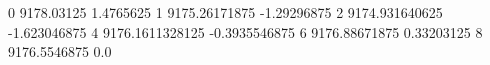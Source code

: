 0 9178.03125 1.4765625
1 9175.26171875 -1.29296875
2 9174.931640625 -1.623046875
4 9176.1611328125 -0.3935546875
6 9176.88671875 0.33203125
8 9176.5546875 0.0
